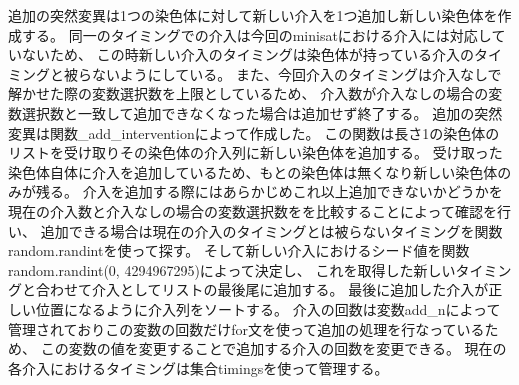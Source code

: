 追加の突然変異は1つの染色体に対して新しい介入を1つ追加し新しい染色体を作成する。
同一のタイミングでの介入は今回のminisatにおける介入には対応していないため、
この時新しい介入のタイミングは染色体が持っている介入のタイミングと被らないようにしている。
また、今回介入のタイミングは介入なしで解かせた際の変数選択数を上限としているため、
介入数が介入なしの場合の変数選択数と一致して追加できなくなった場合は追加せず終了する。
追加の突然変異は関数\_add\_interventionによって作成した。
この関数は長さ1の染色体のリストを受け取りその染色体の介入列に新しい染色体を追加する。
受け取った染色体自体に介入を追加しているため、もとの染色体は無くなり新しい染色体のみが残る。
介入を追加する際にはあらかじめこれ以上追加できないかどうかを現在の介入数と介入なしの場合の変数選択数をを比較することによって確認を行い、
追加できる場合は現在の介入のタイミングとは被らないタイミングを関数random.randintを使って探す。
そして新しい介入におけるシード値を関数random.randint(0, 4294967295)によって決定し、
これを取得した新しいタイミングと合わせて介入としてリストの最後尾に追加する。
最後に追加した介入が正しい位置になるように介入列をソートする。
介入の回数は変数add\_nによって管理されておりこの変数の回数だけfor文を使って追加の処理を行なっているため、
この変数の値を変更することで追加する介入の回数を変更できる。
現在の各介入におけるタイミングは集合timingsを使って管理する。
